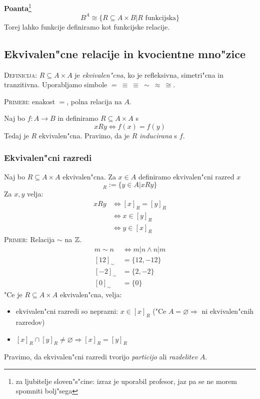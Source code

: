 \textbf{Poanta}\footnote{za ljubitelje sloven"s"cine: izraz je uporabil profesor, jaz pa se ne morem spomniti bolj"sega}
\begin{equation*}
B^A \cong \{R \subseteq A \times B | R \text{ funkcijska}\}
\end{equation*}
Torej lahko funkcije definiramo kot funkcijske relacije.

\subsection{Ekvivalen"cne relacije in kvocientne mno"zice}
\textsc{Definicija}: $R \subseteq A \times A$ je \emph{ekvivalen"cna}, ko je refleksivna, simetri"cna in tranzitivna. Uporabljamo simbole $=\ \equiv\ \equiv\ \sim\ \approx\ \cong$.

\textsc{Primeri:} enakost $=$, polna relacija na $A$.

Naj bo $f: A \to B$ in definiramo $R \subseteq A \times A$ s 
\begin{equation*}
x R y \iff f(x) = f(y)
\end{equation*}
Tedaj je $R$ ekvivalen"cna. Pravimo, da je $R$ \emph{inducirana} s $f$.

\subsubsection{Ekvivalen"cni razredi}
Naj bo $R \subseteq A \times A$ ekvivalen"cna. Za $x \in A$ definiramo ekvivalen"cni razred $x$
\begin{equation*}
[x]_R := \{y \in A| x R y\}
\end{equation*}
Za $x, y$ velja:
\begin{align*}
x R y &\iff [x]_R = [y]_R \\
&\iff x \in [y]_R \\
&\iff y \in [x]_R
\end{align*}
\textsc{Primer:} Relacija $\sim$ na $\mathbb{Z}$.
\begin{align*}
m \sim n &\iff m | n \land n | m \\
[12]_\sim &= \{12, -12\} \\
[-2]_\sim &= \{2, -2\} \\
[0]_\sim &= \{0\}
\end{align*}
"Ce je $R \subseteq A \times A$ ekvivalen"cna, velja:
\begin{itemize}
	\item ekvivalen"cni razredi so neprazni: $x \in [x]_R$ ("Ce $A = \varnothing \Rightarrow$ ni ekvivalen"cnih razredov)
	\item $[x]_R \cap [y]_R \neq \varnothing \Rightarrow [x]_R = [y]_R$
\end{itemize}
Pravimo, da ekvivalen"cni razredi tvorijo \emph{particijo} ali \emph{razdelitev} $A$.

